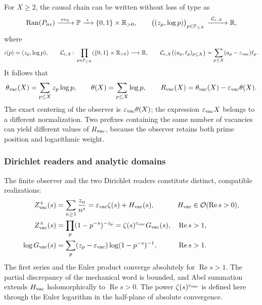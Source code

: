 For \(X\geq2\), the causal chain can be written without loss of type as
\begin{equation}
 \operatorname{Ran}(P_{\rm irr})
 \xrightarrow{\ \operatorname{ev}_9\ }
 \mathbb P
 \xrightarrow{\ \iota\ }
 \{0,1\}\times\mathbb R_{>0},
 \qquad
 \bigl((z_p,\log p)\bigr)_{p\in\mathbb P_{\leq X}}
 \xrightarrow{\ \mathcal C_{\varepsilon,X}\ }
 \mathbb R,
 \label{eq:f051-typed-chain}
\end{equation}
where
\[
 \iota(p)=(z_p,\log p),
 \qquad
 \mathcal C_{\varepsilon,X}\colon
 \prod_{p\in\mathbb P_{\leq X}}
       (\{0,1\}\times\mathbb R_{>0})\longrightarrow\mathbb R,
 \qquad
 \mathcal C_{\varepsilon,X}\bigl((a_p,\ell_p)_{p\leq X}\bigr)
 =\sum_{p\leq X}(a_p-\varepsilon_{\rm vac})\ell_p .
\]
It follows that
\begin{equation}
 \theta_{\rm vac}(X)=\sum_{p\leq X}z_p\log p,
 \qquad
 \theta(X)=\sum_{p\leq X}\log p,
 \qquad
 R_{\rm vac}(X)=\theta_{\rm vac}(X)
                   -\varepsilon_{\rm vac}\theta(X).
 \label{eq:f051-rvac-chebyshev}
\end{equation}
The exact centering of the observer is
\(\varepsilon_{\rm vac}\theta(X)\); the expression
\(\varepsilon_{\rm vac}X\) belongs to a different normalization. Two
prefixes containing the same number of vacancies can yield different
values of \(R_{\rm vac}\), because the observer retains both prime
position and logarithmic weight.

\subsubsection{Dirichlet readers and analytic domains}

The finite observer and the two Dirichlet readers constitute distinct,
compatible realizations:
\begin{align}
 Z^{+}_{\rm vac}(s)
   &=\sum_{n\geq1}\frac{z_n}{n^s}
     =\varepsilon_{\rm vac}\zeta(s)+H_{\rm vac}(s),
 & H_{\rm vac}&\in\mathcal O(\operatorname{Re}s>0),
 \nonumber\\
 Z^{\times}_{\rm vac}(s)
   &=\prod_p(1-p^{-s})^{-z_p}
     =\zeta(s)^{\varepsilon_{\rm vac}}G_{\rm vac}(s),
 & \operatorname{Re}s&>1,
 \label{eq:f051-dirichlet-readers}\\
 \log G_{\rm vac}(s)
   &=\sum_p(z_p-\varepsilon_{\rm vac})
       \log(1-p^{-s})^{-1},
 & \operatorname{Re}s&>1.
 \nonumber
\end{align}
The first series and the Euler product converge absolutely for
\(\operatorname{Re}s>1\). The partial discrepancy of the mechanical word
is bounded, and Abel summation extends \(H_{\rm vac}\) holomorphically to
\(\operatorname{Re}s>0\). The power
\(\zeta(s)^{\varepsilon_{\rm vac}}\) is defined here through the Euler
logarithm in the half-plane of absolute convergence.


